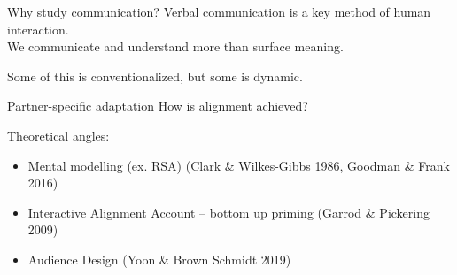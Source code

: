 \documentclass[12pt, xcolor=beamer,table,usenames,dvipsnames, ignorenonframetext, ngerman,t]{beamer}
\begin{document}

\begin{frame}{Why study communication?}
	\pause
	Verbal communication is a key method of human interaction.\\ \pause
	We communicate and understand more than surface meaning.\\ \pause
	
	Some of this is conventionalized, but some is dynamic. \\
	
	
\end{frame}

\begin{frame}{Partner-specific adaptation}
	\pause
	How is alignment achieved? 
	
	\pause
	Theoretical angles: \pause
	\begin{itemize} 
		\item Mental modelling (ex. RSA) (Clark \& Wilkes-Gibbs 1986, Goodman \& Frank 2016) \pause
		\item Interactive Alignment Account -- bottom up priming (Garrod \& Pickering 2009) \pause
		\item Audience Design (Yoon \& Brown Schmidt 2019)
	\end{itemize}
\end{frame}
\end{document}
